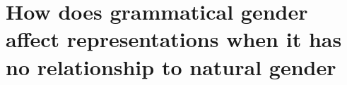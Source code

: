 \chapter{How does grammatical gender affect representations when it has no relationship to natural gender}\label{chapter:x}
